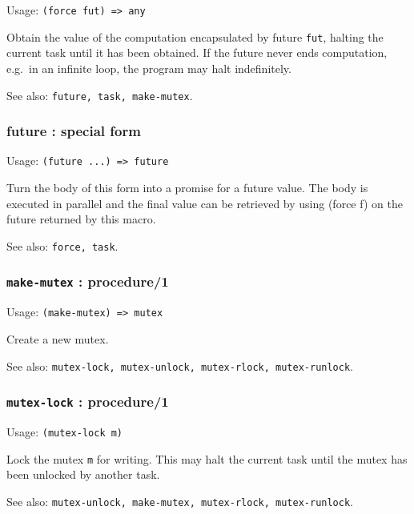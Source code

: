 \documentclass[
]{article}
\newcommand{\passthrough}[1]{#1}
\begin{document}
Usage: \passthrough{\lstinline!(force fut) => any!}

Obtain the value of the computation encapsulated by future
\passthrough{\lstinline!fut!}, halting the current task until it has
been obtained. If the future never ends computation, e.g.~in an infinite
loop, the program may halt indefinitely.

See also: \passthrough{\lstinline!future, task, make-mutex!}.

\hypertarget{future-special-form}{%
\subsubsection{future : special form}\label{future-special-form}}

Usage: \passthrough{\lstinline!(future ...) => future!}

Turn the body of this form into a promise for a future value. The body
is executed in parallel and the final value can be retrieved by using
(force f) on the future returned by this macro.

See also: \passthrough{\lstinline!force, task!}.

\hypertarget{make-mutex-procedure1}{%
\subsubsection{\texorpdfstring{\texttt{make-mutex} :
procedure/1}{make-mutex : procedure/1}}\label{make-mutex-procedure1}}

Usage: \passthrough{\lstinline!(make-mutex) => mutex!}

Create a new mutex.

See also:
\passthrough{\lstinline!mutex-lock, mutex-unlock, mutex-rlock, mutex-runlock!}.

\hypertarget{mutex-lock-procedure1}{%
\subsubsection{\texorpdfstring{\texttt{mutex-lock} :
procedure/1}{mutex-lock : procedure/1}}\label{mutex-lock-procedure1}}

Usage: \passthrough{\lstinline!(mutex-lock m)!}

Lock the mutex \passthrough{\lstinline!m!} for writing. This may halt
the current task until the mutex has been unlocked by another task.

See also:
\passthrough{\lstinline!mutex-unlock, make-mutex, mutex-rlock, mutex-runlock!}.
\end{document}
